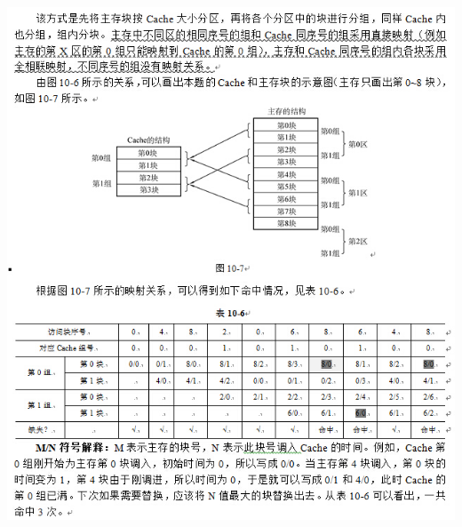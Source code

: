 \begin{solution}
\includegraphics[width=6.66667in,height=7.63542in]{computerassets/3f06ac0859d8a5c827fb5e5c108f981b.jpeg}
\end{solution}
